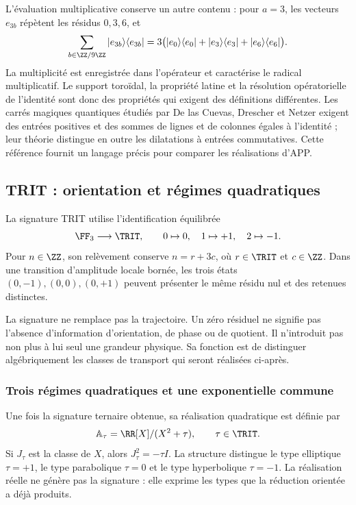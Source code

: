 L'évaluation multiplicative conserve un autre contenu : pour \(a=3\), les
vecteurs \(e_{3b}\) répètent les résidus \(0,3,6\), et
\[
 \sum_{b\in\ZZ/9\ZZ}|e_{3b}\rangle\langle e_{3b}|
 =3\bigl(|e_0\rangle\langle e_0|+|e_3\rangle\langle e_3|
                    +|e_6\rangle\langle e_6|\bigr).
\]
La multiplicité est enregistrée dans l'opérateur et caractérise le radical
multiplicatif. Le support toroïdal, la propriété latine et la
résolution opératorielle de l'identité sont donc des propriétés qui exigent
des définitions différentes. Les carrés magiques quantiques étudiés par
De las Cuevas, Drescher et Netzer exigent des entrées positives et des sommes de lignes
et de colonnes égales à l'identité ; leur théorie distingue en outre les
dilatations à entrées commutatives\cite{delascuevas2020}. Cette référence
fournit un langage précis pour comparer les réalisations d'APP.

\subsection{TRIT : orientation et régimes quadratiques}

\begin{definition}
La signature TRIT utilise l'identification équilibrée
\[
 \FF_3\longrightarrow\TRIT,\qquad 0\mapsto0,\quad1\mapsto+1,\quad2\mapsto-1.
\]
Pour \(n\in\ZZ\), son relèvement conserve \(n=r+3c\), où \(r\in\TRIT\) et \(c\in\ZZ\). Dans une transition d'amplitude locale bornée, les trois états \((0,-1),(0,0),(0,+1)\) peuvent présenter le même résidu nul et des retenues distinctes.
\end{definition}

La signature ne remplace pas la trajectoire. Un zéro résiduel ne signifie pas l'absence d'information d'orientation, de phase ou de quotient. Il n'introduit pas non plus à lui seul une grandeur physique. Sa fonction est de distinguer algébriquement les classes de transport qui seront réalisées ci-après.

\subsubsection{Trois régimes quadratiques et une exponentielle commune}

Une fois la signature ternaire obtenue, sa réalisation quadratique est définie par
\begin{equation}
 \mathbb A_\tau=\RR[X]/(X^2+\tau),\qquad \tau\in\TRIT.
 \label{eq:algebras-trit}
\end{equation}
Si \(J_\tau\) est la classe de \(X\), alors \(J_\tau^2=-\tau I\). La structure distingue le type elliptique \(\tau=+1\), le type parabolique \(\tau=0\) et le type hyperbolique \(\tau=-1\). La réalisation réelle ne génère pas la signature : elle exprime les types que la réduction orientée a déjà produits.

